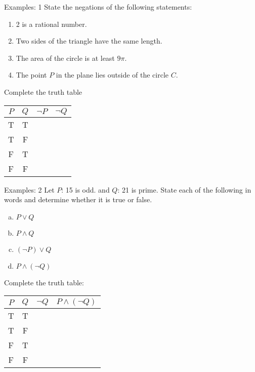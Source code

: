\documentclass{beamer}
\begin{document}
\begin{frame}{Examples: 1}
    State the negations of the following statements: 
\begin{enumerate}
    \item 2 is a rational number.
    \item Two sides of the triangle have the same length.
    \item The area of the circle is at least $9\pi$.
    \item The point $P$ in the plane lies outside of the circle $C$.
\end{enumerate}
Complete the truth table
\begin{center}
\begin{tabular}{|c|c|c|c|}
    \hline
    $P$ & $Q$ & $\neg P$ & $\neg Q$ \\
    \hline
    T & T & & \\
    T & F & & \\
    F & T & & \\
    F & F & & \\
    \hline
\end{tabular}
\end{center}
    
\end{frame}


\begin{frame}{Examples: 2}
Let $P$: 15 is odd. and $Q$: 21 is prime.
State each of the following in words and determine whether it is true or false.
\begin{enumerate}[(a)]
    \item $P \lor Q$
    \item $P \land Q$
    \item $(\neg P) \lor Q$
    \item $P \land (\neg Q)$
\end{enumerate}
Complete the truth table: \begin{center}
\begin{tabular}{|c|c|c|c|}
    \hline
    $P$ & $Q$ & $\neg Q$ & $P \land (\neg Q)$ \\
    \hline
    T & T &  &  \\
    T & F &  &  \\
    F & T &  &  \\
    F & F &  &  \\
    \hline
\end{tabular}
\end{center}
    
\end{frame}
\end{document}
